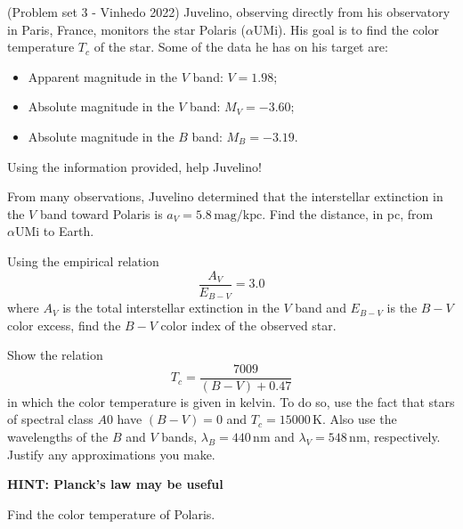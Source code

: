 \documentclass[11pt]{article}
\begin{document}
\begin{pproblem}(Problem set 3 - Vinhedo 2022)
Juvelino, observing directly from his observatory in Paris, France, monitors the star Polaris ($\alpha\text{UMi}$). His goal is to find the color temperature $T_c$ of the star. Some of the data he has on his target are:

\begin{itemize}
    \item Apparent magnitude in the $V$ band: $V = 1.98$;
    \item Absolute magnitude in the $V$ band: $M_V = -3.60$;
    \item Absolute magnitude in the $B$ band: $M_B = -3.19$.
\end{itemize}

Using the information provided, help Juvelino!

\begin{alternativas}
    \item From many observations, Juvelino determined that the interstellar extinction in the $V$ band toward Polaris is $a_V = 5.8 \, \text{mag/kpc}$. Find the distance, in pc, from $\alpha\text{UMi}$ to Earth.
    \item Using the empirical relation
    \begin{equation}
        \frac{A_V}{E_{B-V}} = 3.0
    \end{equation}
    where $A_V$ is the total interstellar extinction in the $V$ band and $E_{B-V}$ is the $B-V$ color excess, find the $B-V$ color index of the observed star.
    \item Show the relation
    \begin{equation}
        T_c = \frac{7009}{(B-V) + 0.47}
    \end{equation}
    in which the color temperature is given in kelvin. To do so, use the fact that stars of spectral class $A0$ have $(B-V) = 0$ and $T_c = 15000 \, \text{K}$. Also use the wavelengths of the $B$ and $V$ bands, $\lambda_B = 440 \, \text{nm}$ and $\lambda_V = 548 \, \text{nm}$, respectively. Justify any approximations you make.

    \textbf{HINT: Planck's law may be useful}
    \item Find the color temperature of Polaris.
\end{alternativas}
\end{pproblem}
\end{document}

